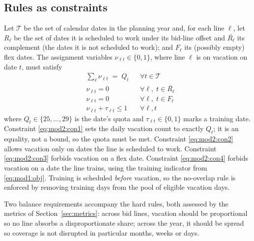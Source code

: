 \documentclass[preprint,12pt]{elsarticle}
\begin{document}
   \subsection{Rules as constraints}
   Let $\mathcal{T}$ be the set of calendar dates in the planning year and, for each line $\ell$, let $R_\ell$ be the set of dates it is scheduled to work under its bid-line offset and $\bar{R_\ell}$ its complement (the dates it is not scheduled to work); and $F_\ell$ its (possibly empty) flex dates. The assignment variables $\nu_{\ell t}\in\{0,1\}$, where line $\ell$ is on vacation on date $t$, must satisfy
   \begin{align}
      & \sum\limits_{\ell} \nu_{\ell t} \;=\; Q_t && \forall t \in \mathcal{T} \label{eq:mod2:con1}\\
      & \nu_{\ell t} = 0 && \forall \ell,\; t \in \bar{R_\ell} \label{eq:mod2:con2}\\
      & \nu_{\ell t} = 0 && \forall \ell,\; t \in F_\ell \label{eq:mod2:con3}\\
      & \nu_{\ell t} + \tau_{\ell t} \le 1 && \forall \ell, t \label{eq:mod2:con4}
   \end{align}
   where $Q_t\in\{25,\dots,29\}$ is the date's quota and $\tau_{\ell t}\in\{0,1\}$ marks a training date. Constraint \eqref{eq:mod2:con1} sets the daily vacation count to exactly $Q_t$; it is an equality, not a bound, so the quota must be met. Constraint \eqref{eq:mod2:con2} allows vacation only on dates the line is scheduled to work. Constraint \eqref{eq:mod2:con3} forbids vacation on a flex date. Constraint \eqref{eq:mod2:con4} forbids vacation on a date the line trains, using the training indicator from \eqref{eq:mod1:obj}. Training is scheduled \emph{before} vacation, so the no-overlap rule is enforced by removing training days from the pool of eligible vacation days.

   Two balance requirements accompany the hard rules, both assessed by the metrics of Section~\ref{sec:metrics}: across bid lines, vacation should be proportional so no line absorbs a disproportionate share; across the year, it should be spread so coverage is not disrupted in particular months, weeks or days.
\end{document}
